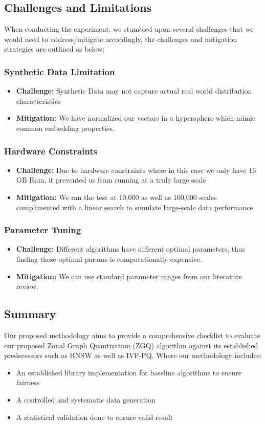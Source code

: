 \documentclass[conference]{IEEEtran}
\begin{document}
\subsection{Challenges and Limitations}
When conducting the experiment, we stumbled upon several challenges that we would need to address/mitigate accordingly, the challenges and mitigation strategies are outlined as below:

\subsubsection{Synthetic Data Limitation}
\begin{itemize}
    \item \textbf{Challenge:} Synthetic Data may not capture actual real world distribution characteristics
    \item \textbf{Mitigation:} We have normalized our vectors in a hypersphere which mimic common embedding properties.
\end{itemize}

\subsubsection{Hardware Constraints}
\begin{itemize}
    \item \textbf{Challenge:} Due to hardware constraints where in this case we only have 16 GB Ram, it prevented us from running at a truly large scale
    \item \textbf{Mitigation:} We ran the test at 10,000 as well as 100,000 scales complimented with a linear search to simulate large-scale data performance
\end{itemize}

\subsubsection{Parameter Tuning}
\begin{itemize}
    \item \textbf{Challenge:} Different algorithms have different optimal parameters, thus finding these optimal params is computationally expensive.
    \item \textbf{Mitigation:} We can use standard parameter ranges from our literature review.
\end{itemize}

\subsection{Summary}
Our proposed methodology aims to provide a comprehensive checklist to evaluate our proposed Zonal Graph Quantization (ZGQ) algorithm against its established predecessors such as HNSW as well as IVF-PQ. Where our methodology includes:
\begin{itemize}
    \item An established library implementation for baseline algorithms to ensure fairness
    \item A controlled and systematic data generation
    \item A statistical validation done to ensure valid result
\end{itemize}
\end{document}

